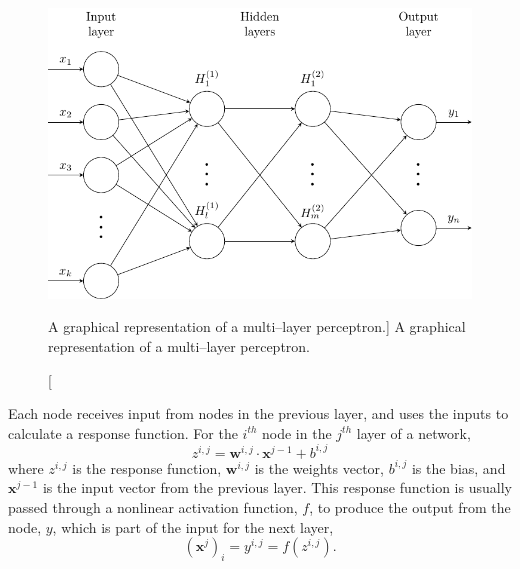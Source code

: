 \begin{figure}

	\centering

	\includegraphics[width = \textwidth]{figures/mlp.pdf}

	\caption
	[A graphical representation of a multi--layer perceptron.]
	{ A graphical representation of a multi--layer perceptron. }

	\label{fig:mlp}

\end{figure}

Each node receives input from nodes in the previous layer, and uses the inputs
to calculate a response function. For the $i^{th}$ node in the $j^{th}$ layer 
of a network, 
\begin{equation*}
	z^{i,j} = \mathbf{w}^{i,j} \cdot \mathbf{x}^{j-1} + b^{i,j}
\end{equation*}
where $z^{i,j}$ is the response function, $\mathbf{w}^{i,j}$ is the weights
vector, $b^{i,j}$ is the bias, and $\mathbf{x}^{j-1}$ is the input vector from 
the previous layer. This response function is usually passed through a
nonlinear activation function, $f$, to produce the output from the node,
$y$, which is part of the input for the next layer,
\begin{equation*}
	\left(\mathbf{x}^j\right)_i = y^{i,j} = f \left( z^{i,j} \right).
\end{equation*}

